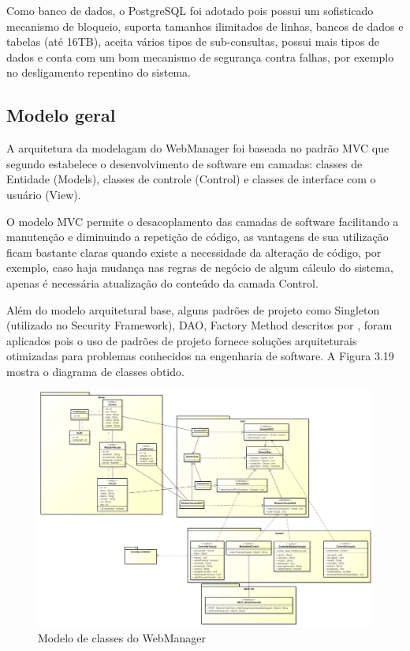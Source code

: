 Como banco de dados, o PostgreSQL foi adotado  pois possui um sofisticado mecanismo de bloqueio, suporta tamanhos ilimitados de linhas, bancos de dados e tabelas (até 16TB), aceita vários tipos de sub-consultas, possui mais tipos de dados e conta com um bom mecanismo de segurança contra falhas, por exemplo no desligamento repentino do sistema.

\subsection{Modelo geral}

A arquitetura da modelagam do WebManager foi baseada no padrão MVC que segundo \textcite{Mendes:2002} estabelece o desenvolvimento de software em camadas: classes de Entidade (Models), classes de controle (Control) e classes de interface com o usuário (View). 

O modelo MVC permite o desacoplamento das camadas de software facilitando a manutenção e diminuindo a repetição de código, as vantagens de sua utilização ficam bastante claras quando existe a necessidade da alteração de código, por exemplo, caso haja mudança nas regras de negócio de algum cálculo do sistema, apenas é necessária atualização do conteúdo da camada Control.

Além do modelo arquitetural base, alguns padrões de projeto como Singleton (utilizado no Security Framework), DAO, Factory Method descritos por \textcite{Gamma:2000}, foram aplicados pois o uso de padrões de projeto fornece soluções arquiteturais otimizadas para problemas conhecidos na engenharia de software. A Figura 3.19 mostra o diagrama de classes obtido.

\begin{landscape}

\begin{figure}[!htb]
	\centering
	\includegraphics[width=20.00cm\textwidth]{figures/6_web_manager.png}
	\caption{Modelo de classes do WebManager}
	\label{}
\end{figure}
\end{landscape}

